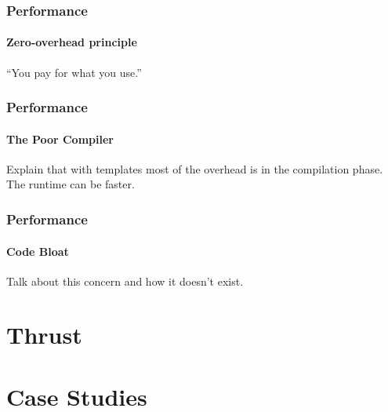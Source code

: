 \documentclass{beamer}
\begin{document}






\begin{frame}
  \frametitle{Performance}
  \framesubtitle{Zero-overhead principle}
  {\Huge ``You pay for what you use.''}
\end{frame}

\begin{frame}
  \frametitle{Performance}
  \framesubtitle{The Poor Compiler}
  Explain that with templates most of the overhead is
  in the compilation phase. The runtime can be faster.
\end{frame}

\begin{frame}
  \frametitle{Performance}
  \framesubtitle{Code Bloat}
  Talk about this concern and how it doesn't exist.
\end{frame}

\section{Thrust}



\section{Case Studies}
\end{document}
